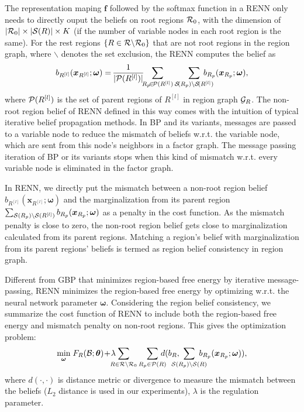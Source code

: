 The representation maping $\bm{f}$ followed by the softmax function in a RENN only needs to directly ouput the beliefs on root regions $\mathcal{R}_0$, with the dimension of $|\mathcal{R}_0| \times |\mathcal{S}(R)| \times K$ (if the number of variable nodes in each root region is the same).
For the rest regions $\left\{R \in \mathcal{R} \backslash \mathcal{R}_0 \right\}$ that are not root regions in the region graph, where $\backslash$ denotes the set exclusion, the RENN computes the belief as
\begin{equation}\label{eq:l-level-beliefs}
  b_{R^{[l]}}(\bm{x}_{R^{[l]}}; \bm{\omega}) = \hspace{-0.04cm}\frac{1}{|\Pp(R^{[l]})|}\hspace{-0.15cm} \sum_{R_p\!\in \! \Pp(R^{[l]})}\sum_{\Ss\!(R_p)\backslash \Ss\!(R^{[l]})} \hspace{-0.5cm}b_{R_p}(\bm{x}_{R_p}; \bm{\omega}),
\end{equation}
where $\mathcal{P}(R^{[l]})$ is the set of parent regions of $R^{[l]}$ in region graph $\mathcal{G}_R$. The non-root region belief of RENN defined in this way comes with the intuition of typical iterative belief propagation methods. In BP and its variants, messages are passed to a variable node to reduce the mismatch of beliefs w.r.t. the variable node, which are sent from this node's neighbors in a factor graph. The message passing iteration of BP or its variants stops when this kind of mismatch w.r.t. every variable node is eliminated in the factor graph.

In RENN, we directly put the mismatch between a non-root region belief $b_{R^{[l]}}(\bm{x}_{R^{[l]}}; \bm{\omega})$ and the marginalization from its parent region $\sum_{\mathcal{S}(R_p)\backslash \mathcal{S}(R^{[l]})}b_{R_p}(\bm{x}_{R_p}; \bm{\omega})$ as a penalty in the cost function. As the mismatch penalty is close to zero, the non-root region belief gets close to marginalization calculated from its parent regions. Matching a region's belief with marginalization from its parent regions' beliefs is termed as region belief consistency in region graph.

Different from GBP that minimizes region-based free energy by iterative message-passing, RENN minimizes the region-based free energy by optimizing w.r.t. the neural network parameter $\bm{\omega}$.
Considering the region belief consistency, we summarize the cost function of RENN to include both the region-based free energy and mismatch penalty on non-root regions. This gives the optimization problem:
\begin{equation}\label{eq:infer-F-all-belief}
  \umin{\bm{\omega}}{F_R(\Bb;\bm{\theta}) \!+\! \lambda \hspace{-0.3cm}\sum_{R\in \Rr \backslash \Rr_0} \sum_{R_p \in \Pp(R)}\hspace{-0.3cm}d( b_R, \hspace{-0.4cm}\sum_{\Ss(R_p)\backslash \Ss(R)}\hspace{-0.4cm} b_{R_p}(\bm{x}_{R_p}; \bm{\omega}))},
\end{equation}
where $d(\cdot, \cdot)$ is distance metric or divergence to measure the mismatch between the beliefs ($L_2$ distance is used in our experiments), $\lambda$ is the regulation parameter.

